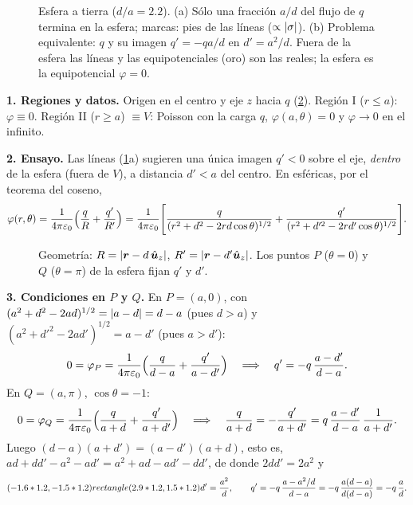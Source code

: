 \documentclass[11pt,a4paper,twoside]{article}
\begin{document}
\begin{figure}[!htb]
  \centering
  
  \caption{Esfera a tierra ($d/a=2.2$). (a) Sólo una fracción $a/d$ del flujo de $q$ termina
  en la esfera; marcas: pies de las líneas ($\propto\left\lvert \sigma\right\rvert$). (b) Problema equivalente:
  $q$ y su imagen $q'=-qa/d$ en $d'=a^{2}/d$. Fuera de la esfera las líneas y las
  equipotenciales (oro) son las reales; la esfera es la equipotencial $\varphi=0$.}
  \label{fig:esfera-lineas}
\end{figure}

\begin{resolucion}
\textbf{1. Regiones y datos.} Origen en el centro y eje $z$ hacia $q$ (\cref{fig:esfera-geo}).
Región I ($r\le a$): $\varphi\equiv0$. Región II ($r\ge a$) $\equiv V$: Poisson con la carga
$q$, $\varphi(a,\theta)=0$ y $\varphi\to0$ en el infinito.

\textbf{2. Ensayo.} Las líneas (\cref{fig:esfera-lineas}a) sugieren una única imagen $q'<0$
sobre el eje, \emph{dentro} de la esfera (fuera de $V$), a distancia $d'<a$ del centro. En
esféricas, por el teorema del coseno,
\begin{equation}\label{eq:esfera-ensayo}
  \varphi(r,\theta)=\frac{1}{4\pi\varepsilon_{0}}\Bigl(\frac{q}{R}+\frac{q'}{R'}\Bigr)
  =\frac{1}{4\pi\varepsilon_{0}}\Biggl[\frac{q}{(r^{2}+d^{2}-2rd\cos\theta)^{1/2}}
  +\frac{q'}{(r^{2}+d'^{2}-2rd'\cos\theta)^{1/2}}\Biggr].
\end{equation}

\begin{figure}[!htb]
  \centering
  
  \caption{Geometría: $R=\left\lvert \bm{r}-d\,\hat{\bm{u}}_z\right\rvert$, $R'=\left\lvert \bm{r}-d'\hat{\bm{u}}_z\right\rvert$. Los puntos
  $P$ ($\theta=0$) y $Q$ ($\theta=\pi$) de la esfera fijan $q'$ y $d'$.}
  \label{fig:esfera-geo}
\end{figure}

\textbf{3. Condiciones en $P$ y $Q$.} En $P=(a,0)$, con $(a^{2}+d^{2}-2ad)^{1/2}=\left\lvert a-d\right\rvert=d-a$
(pues $d>a$) y $(a^{2}+d'^{2}-2ad')^{1/2}=a-d'$ (pues $a>d'$):
\[
  0=\varphi_P=\frac{1}{4\pi\varepsilon_{0}}\Bigl(\frac{q}{d-a}+\frac{q'}{a-d'}\Bigr)
  \quad\Longrightarrow\quad q'=-q\,\frac{a-d'}{d-a}.
\]
En $Q=(a,\pi)$, $\cos\theta=-1$:
\[
  0=\varphi_Q=\frac{1}{4\pi\varepsilon_{0}}\Bigl(\frac{q}{a+d}+\frac{q'}{a+d'}\Bigr)
  \quad\Longrightarrow\quad\frac{q}{a+d}=-\frac{q'}{a+d'}=q\,\frac{a-d'}{d-a}\,\frac{1}{a+d'} .
\]
Luego $(d-a)(a+d')=(a-d')(a+d)$, esto es,
$ad+dd'-a^{2}-ad'=a^{2}+ad-ad'-dd'$, de donde $2dd'=2a^{2}$ y
\begin{equation}\label{eq:esfera-imagen}
  (-1.6*1.2,-1.5*1.2) rectangle (2.9*1.2,1.5*1.2){d'=\frac{a^{2}}{d},\qquad
  q'=-q\,\frac{a-a^{2}/d}{d-a}=-q\,\frac{a(d-a)}{d(d-a)}=-q\,\frac{a}{d}.}
\end{equation}


\end{resolucion}
\end{document}
